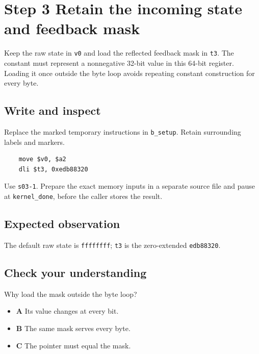 \section{Step 3 Retain the incoming state and feedback mask}\label{crc-s03}

Keep the raw state in \texttt{v0} and load the reflected feedback mask in \texttt{t3}. The constant must represent a nonnegative 32-bit value in this 64-bit register. Loading it once outside the byte loop avoids repeating constant construction for every byte.

\subsection{Write and inspect}
Replace the marked temporary instructions in \texttt{b\_setup}. Retain surrounding labels and markers.

\begin{verbatim}
    move $v0, $a2
    dli $t3, 0xedb88320
\end{verbatim}

Use \texttt{s03-1}. Prepare the exact memory inputs in a separate source file and pause at \texttt{kernel\_done}, before the caller stores the result.

\subsection{Expected observation}
The default raw state is \texttt{ffffffff}; \texttt{t3} is the zero-extended \texttt{edb88320}.

\subsection{Check your understanding}
Why load the mask outside the byte loop?

\begin{itemize}
\item \textbf{A} Its value changes at every bit.
\item \textbf{B} The same mask serves every byte.
\item \textbf{C} The pointer must equal the mask.
\end{itemize}
